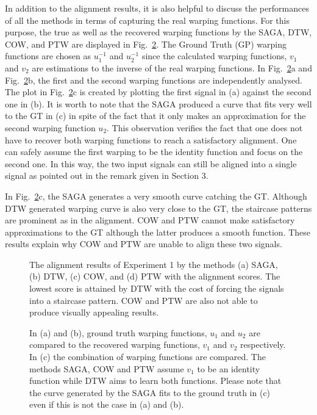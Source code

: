 \documentclass[number,1p,12pt]{elsarticle}
\begin{document}
In addition to the alignment results, it is also helpful to discuss the performances of all the methods in terms of capturing the real warping functions. For this purpose, the true as well as the recovered warping functions by the SAGA, DTW, COW, and PTW are displayed in Fig.~\ref{Figure05}. The Ground Truth (GP) warping functions are chosen as $u_1^{-1}$ and $u_2^{-1}$ since the calculated warping functions, $v_1$ and $v_2$ are estimations to the inverse of the real warping functions.  In Fig.~\ref{Figure05}a and Fig.~\ref{Figure05}b, the first and the second warping functions are independently analysed. The plot in Fig.~\ref{Figure05}c is created by plotting the first signal in (a) against the second one in (b). It is worth to note that the SAGA produced a curve that fits very well to the GT in (c) in spite of the fact that it only makes an approximation for the second warping function $u_2$.  This observation verifies the fact that one does not have to recover both warping functions to reach a satisfactory alignment. One can safely assume the first warping to be the identity function and focus on the second one. In this way, the two input signals can still be aligned into a single signal as pointed out in the remark given in Section 3. 

In Fig.~\ref{Figure05}c, the SAGA generates a very smooth curve catching the GT. Although DTW generated warping curve is also very close to the GT, the staircase patterns are prominent as in the alignment. COW and PTW cannot make satisfactory approximations to the GT although the latter produces a smooth function. These results explain why COW and PTW are unable to align these two signals.

\begin{figure}[t]
\caption{The alignment results of Experiment 1 by the methods (a) SAGA, (b) DTW, (c) COW, and (d) PTW with the alignment scores. The lowest score is attained by DTW with the cost of forcing the signals into a staircase pattern. COW and PTW are also not able to produce visually appealing results. }
\label{Figure04}
\end{figure} 

\begin{figure}
\caption{In (a) and (b), ground truth warping functions, $u_1$ and $u_2$ are compared to the recovered warping functions, $v_1$ and $v_2$ respectively. In (c) the combination of warping functions are compared. The methods SAGA, COW and PTW assume $v_1$ to be an identity function while DTW aims to learn both functions. Please note that the curve generated by the SAGA fits to the ground truth in (c) even if this is not the case in (a) and (b).}
\label{Figure05}
\end{figure}
\end{document}
